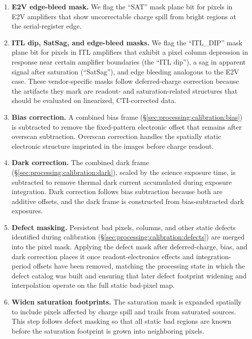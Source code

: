 \begin{enumerate}
    \item \textbf{E2V edge-bleed mask.}
    We flag the ``SAT'' mask plane bit for pixels in E2V amplifiers that show uncorrectable charge spill from bright regions at the serial-register edge.
    
    \item \textbf{ITL dip, SatSag, and edge-bleed masks.}
    We flag the ``ITL\_DIP'' mask plane bit for pixels in ITL amplifiers that exhibit a pixel column depression in response near certain amplifier boundaries (the ``ITL dip''), a sag in apparent signal after saturation (``SatSag''), and edge bleeding analogous to the E2V case.
    These vendor-specific masks follow deferred-charge correction because the artifacts they mark are readout- and saturation-related structures that should be evaluated on linearized, CTI-corrected data.

    \item \textbf{Bias correction.}
    A combined bias frame (\S\ref{sec:processing:calibration:bias}) is subtracted to remove the fixed-pattern electronic offset that remains after overscan subtraction.
    Overscan correction handles the spatially static electronic structure imprinted in the images before charge readout.

    \item \textbf{Dark correction.}
    The combined dark frame (\S\ref{sec:processing:calibration:dark}), scaled by the science exposure time, is subtracted to remove thermal dark current accumulated during exposure integration.
    Dark correction follows bias subtraction because both are additive offsets, and the dark frame is constructed from bias-subtracted dark exposures.

    \item \textbf{Defect masking.}
    Persistent bad pixels, columns, and other static defects identified during calibration (\S\ref{sec:processing:calibration:defects}) are merged into the pixel mask.
    Applying the defect mask after deferred-charge, bias, and dark correction places it once readout-electronics effects and integration-period offsets have been removed, matching the processing state in which the defect catalog was built and ensuring that later defect footprint widening and interpolation operate on the full static bad-pixel map.

    \item \textbf{Widen saturation footprints.}
    The saturation mask is expanded spatially to include pixels affected by charge spill and trails from saturated sources.
    This step follows defect masking so that all static bad regions are known before the saturation footprint is grown into neighboring pixels.


\end{enumerate}
